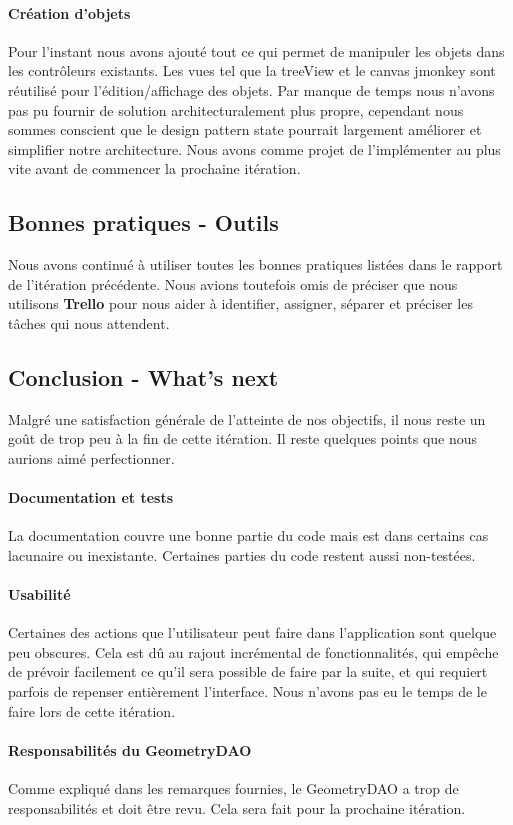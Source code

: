 		\paragraph{Création d'objets}
		Pour l'instant nous avons ajouté tout ce qui permet de manipuler les objets dans les contrôleurs existants. Les vues tel que la treeView et le canvas jmonkey sont réutilisé pour l'édition/affichage des objets. Par manque de temps nous n'avons pas pu fournir de solution architecturalement plus propre, cependant nous sommes conscient que le design pattern state pourrait largement améliorer et simplifier notre architecture. Nous avons comme projet de l'implémenter au plus vite avant de commencer la prochaine itération.


\subsection{Bonnes pratiques - Outils}

Nous avons continué à utiliser toutes les bonnes pratiques listées dans le
rapport de l'itération précédente. Nous avions toutefois omis de préciser que
nous utilisons \textbf{Trello} pour nous aider à identifier, assigner, séparer 
et préciser les tâches qui nous attendent. 

\subsection{Conclusion - What's next}
Malgré une satisfaction générale de l'atteinte de nos objectifs, il nous reste 
un goût de trop peu à la fin de cette itération. Il reste quelques points que 
nous aurions aimé perfectionner.

	\paragraph{Documentation et tests} 
	La documentation couvre une bonne partie du code mais est dans certains cas 
	lacunaire ou inexistante. Certaines parties du code restent aussi non-testées.

	\paragraph{Usabilité} 
	Certaines des actions que l'utilisateur peut faire dans l'application sont
	quelque peu obscures. Cela est dû au rajout incrémental de fonctionnalités, 
	qui empêche de prévoir facilement ce qu'il sera possible de faire par la suite, 
	et qui requiert parfois de repenser entièrement l'interface. Nous n'avons
	pas eu le temps de le faire lors de cette itération.

	\paragraph{Responsabilités du GeometryDAO}
	Comme expliqué dans les remarques fournies, le GeometryDAO a trop de 
	responsabilités et doit être revu. Cela sera fait pour la prochaine 
	itération.
